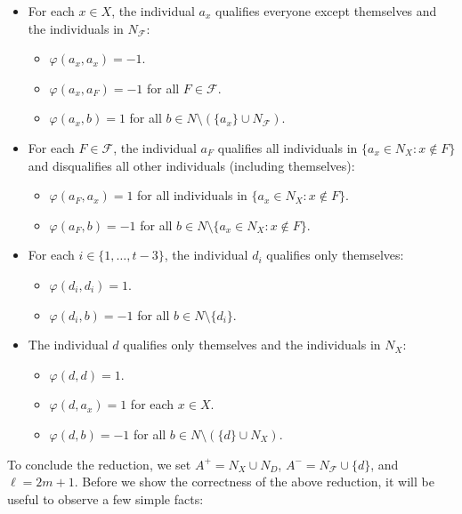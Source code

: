 \documentclass[
    12pt,               %
    a4paper,            %
    bibtotoc,           %
    pointlessnumbers,   %
    ngerman,            %
    titlepage,          %
    leqno,              %
    ]{scrarticle}       %
\begin{document}
\begin{Proof}
\begin{itemize}[nolistsep]
\item
For each $x \in X$, the individual $a_x$ qualifies everyone except themselves and the individuals in $N_\mathcal{F}$:
    \begin{itemize}[nolistsep]
    \item
    $\varphi(a_x, a_x) = -1$.
    \item
    $\varphi(a_x, a_F) = -1$ for all $F \in \mathcal{F}$.
    \item
    $\varphi(a_x, b) = 1$ for all $b \in N \setminus (\{a_x\} \cup N_\mathcal{F})$.
    \end{itemize}
\item
For each $F \in \mathcal{F}$, the individual $a_F$ qualifies all individuals in $\{ a_x \in N_X : x \not\in F \}$ and disqualifies all other individuals (including themselves):
    \begin{itemize}[nolistsep]
    \item
    $\varphi(a_F, a_x) = 1$ for all individuals in $\{ a_x \in N_X : x \not\in F \}$.
    \item
    $\varphi(a_F, b) = -1$ for all $b \in N \setminus \{ a_x \in N_X : x \not\in F \}$.
    \end{itemize}
\item
For each $i \in \{ 1, \ldots, t-3 \}$, the individual $d_i$ qualifies only themselves:
    \begin{itemize}[nolistsep]
    \item
    $\varphi(d_i, d_i) = 1$.
    \item
    $\varphi(d_i, b) = -1$ for all $b \in N \setminus \{d_i\}$.
    \end{itemize}
\item
The individual $d$ qualifies only themselves and the individuals in $N_X$:
    \begin{itemize}[nolistsep]
    \item
    $\varphi(d, d) = 1$.
    \item
    $\varphi(d, a_x) = 1$ for each $x \in X$.
    \item
    $\varphi(d, b) = -1$ for all $b \in N \setminus (\{d\} \cup N_X)$.
    \end{itemize}
\end{itemize}

To conclude the reduction, we set $A^+ = N_X \cup N_D$, $A^- = N_\mathcal{F} \cup \{d\}$, and $\ell = 2m+1$. Before we show the correctness of the above reduction, it will be useful to observe a few simple facts:


\end{Proof}
\end{document}
